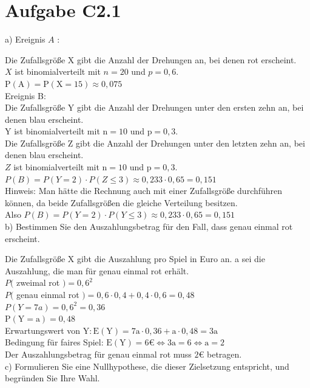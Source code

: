 \documentclass[10pt]{article}
\begin{document}
\section*{Aufgabe C2.1}
a) Ereignis $A$ :

Die Zufallsgröße X gibt die Anzahl der Drehungen an, bei denen rot erscheint.\\
$X$ ist binomialverteilt mit $n=20$ und $p=0,6$.\\
$\mathrm{P}(\mathrm{A})=\mathrm{P}(\mathrm{X}=15) \approx 0,075$\\
Ereignis B:\\
Die Zufallsgröße Y gibt die Anzahl der Drehungen unter den ersten zehn an, bei denen blau erscheint.\\
Y ist binomialverteilt mit $\mathrm{n}=10$ und $\mathrm{p}=0,3$.\\
Die Zufallsgröße Z gibt die Anzahl der Drehungen unter den letzten zehn an, bei denen blau erscheint.\\
$Z$ ist binomialverteilt mit $\mathrm{n}=10$ und $\mathrm{p}=0,3$.\\
$P(B)=P(Y=2) \cdot P(Z \leq 3) \approx 0,233 \cdot 0,65=0,151$\\
Hinweis: Man hätte die Rechnung auch mit einer Zufallsgröße durchführen können, da beide Zufallsgrößen die gleiche Verteilung besitzen.\\
Also $P(B)=P(Y=2) \cdot P(Y \leq 3) \approx 0,233 \cdot 0,65=0,151$\\
b) Bestimmen Sie den Auszahlungsbetrag für den Fall, dass genau einmal rot erscheint.

Die Zufallsgröße X gibt die Auszahlung pro Spiel in Euro an. a sei die Auszahlung, die man für genau einmal rot erhält.\\
$P($ zweimal rot $)=0,6^{2}$\\
$P($ genau einmal rot $)=0,6 \cdot 0,4+0,4 \cdot 0,6=0,48$\\
$P(Y=7 a)=0,6^{2}=0,36$\\
$\mathrm{P}(\mathrm{Y}=\mathrm{a})=0,48$\\
Erwartungswert von $\mathrm{Y}: \mathrm{E}(\mathrm{Y})=7 \mathrm{a} \cdot 0,36+\mathrm{a} \cdot 0,48=3 \mathrm{a}$\\
Bedingung für faires Spiel: $\mathrm{E}(\mathrm{Y})=6 € \Leftrightarrow 3 \mathrm{a}=6 \Leftrightarrow \mathrm{a}=2$\\
Der Auszahlungsbetrag für genau einmal rot muss $2 €$ betragen.\\
c) Formulieren Sie eine Nullhypothese, die dieser Zielsetzung entspricht, und begründen Sie Ihre Wahl.
\end{document}
